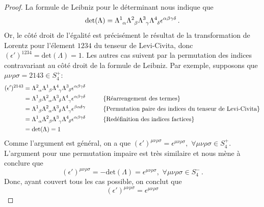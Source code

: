 \documentclass{article}
\numberwithin{equation}{section}
\theoremstyle{solution}
\begin{document}
\begin{proof}
La formule de Leibniz pour le déterminant nous indique que
\begin{equation}\label{eq:Leibniz}
        \mathrm{det}(\Lambda) = \Lambda\indices{^{1}_{\alpha}}\Lambda\indices{^{2}_{\beta}}\Lambda\indices{^{3}_{\gamma}}\Lambda\indices{^{4}_{\delta}}\epsilon^{\alpha\beta\gamma\delta}\, .
\end{equation} 
Or, le côté droit de l'égalité est précisément le résultat de la transformation de Lorentz pour l'élement $1234$ du tenseur de Levi-Civita, 
donc $(\epsilon')^{1234} = \mathrm{det}(\Lambda) = 1$. 
Les autres cas suivent par la permutation des indices contravariant au côté droit de la formule de Leibniz. 
Par exemple, supposons que $\mu\nu\rho\sigma = 2143 \in S_4^{+}$:
\begin{align*}
        (\epsilon')^{2143} &= \Lambda\indices{^{2}_{\alpha}}\Lambda\indices{^{1}_{\beta}}\Lambda\indices{^{4}_{\gamma}}\Lambda\indices{^{3}_{\delta}}\epsilon^{\alpha\beta\gamma\delta}\\
                           &= \Lambda\indices{^{1}_{\beta}}\Lambda\indices{^{2}_{\alpha}}\Lambda\indices{^{3}_{\delta}}\Lambda\indices{^{4}_{\gamma}}\epsilon^{\alpha\beta\gamma\delta}  \hspace{1cm} \{\text{Réarrengement des termes}\} \\
               &= \Lambda\indices{^{1}_{\beta}}\Lambda\indices{^{2}_{\alpha}}\Lambda\indices{^{3}_{\delta}}\Lambda\indices{^{4}_{\gamma}}\epsilon^{\beta\alpha\delta\gamma}  \hspace{1cm} \{\text{Permutation paire des indices du tenseur de Levi-Civita} \} \\
               &= \Lambda\indices{^{1}_{\alpha}}\Lambda\indices{^{2}_{\beta}}\Lambda\indices{^{3}_{\gamma}}\Lambda\indices{^{4}_{\delta}}\epsilon^{\alpha\beta\gamma\delta}  \hspace{1cm} \{\text{Redéfinition des indices factices} \} \\
               &= \mathrm{det}(\Lambda) = 1\\ 
\end{align*} 
Comme l'argument est général, on a que $(\epsilon')^{\mu\nu\rho\sigma} = \epsilon^{\mu\nu\rho\sigma},\,\, \forall \mu\nu\rho\sigma \in S_4^{+}$.
L'argument pour une permutation impaire est très similaire et nous mène à conclure que 
$$(\epsilon')^{\mu\nu\rho\sigma} = -\mathrm{det}(\Lambda) = \epsilon^{\mu\nu\rho\sigma}, \,\, \forall \mu\nu\rho\sigma \in S_4^{-}\, .$$ 
Donc, ayant couvert tous les cas possible, on conclut que
\begin{equation}
        \boxed{(\epsilon')^{\mu\nu\rho\sigma} = \epsilon^{\mu\nu\rho\sigma}}
\end{equation} 
\end{proof}
        
\end{document}
